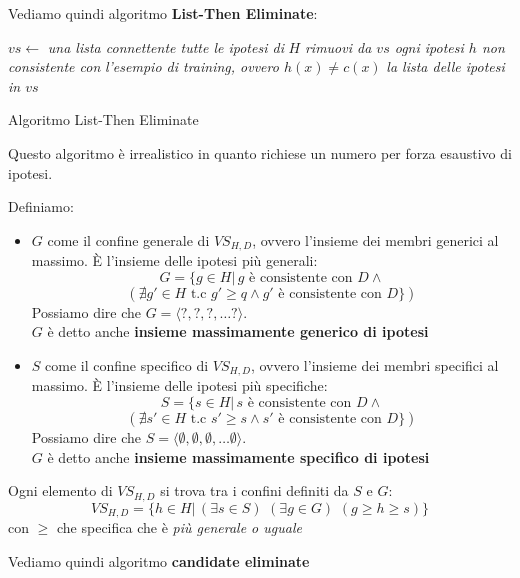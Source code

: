 \documentclass[a4paper,12pt, oneside]{book}
\begin{document}
Vediamo quindi algoritmo \textbf{List-Then Eliminate}:
\begin{algorithm}[H]
  \begin{algorithmic}
    \State $vs \gets$ \textit{una lista connettente tutte le ipotesi di } $H$
    \State \textit{rimuovi da $vs$ ogni ipotesi $h$ non consistente con}
    \State \textit{l'esempio di training, ovvero $h(x)\neq c(x)$}
    \EndFor
    \Return \textit{la lista delle ipotesi in $vs$}
    \EndFunction
  \end{algorithmic}
  \caption{Algoritmo List-Then Eliminate}
\end{algorithm}
Questo algoritmo è irrealistico in quanto richiese un numero per forza esaustivo
di ipotesi.
\begin{definizione}
  Definiamo:
  \begin{itemize}
    \item $G$ come il confine generale di $VS_{H,D}$, ovvero l'insieme dei
    membri generici al massimo. È l'insieme delle ipotesi più generali:
    \[G=\{g\in H|\, g\mbox{ è consistente con }D \land\]
    \[ (\nexists g'\in H \mbox{ t.c } g'\geq q \land g'\mbox{ è consistente con
      }D\})\]
    Possiamo dire che $G=\langle ?,?,?,\ldots ?\rangle$.\\
    $G$ è detto anche \textbf{insieme massimamente generico di ipotesi}
    \item $S$ come il confine specifico di $VS_{H,D}$, ovvero l'insieme dei
    membri specifici al massimo. È l'insieme delle ipotesi più specifiche:
     \[S=\{s\in H|\, s\mbox{ è consistente con }D \land\]
    \[ (\nexists s'\in H \mbox{ t.c } s'\geq s \land s'\mbox{ è consistente con
      }D\})\]
    Possiamo dire che $S=\langle \emptyset,\emptyset,\emptyset,\ldots \emptyset
    \rangle$.\\
        $G$ è detto anche \textbf{insieme massimamente specifico di ipotesi}

      \end{itemize}
    \end{definizione}
    \begin{teorema}
      Ogni elemento di $VS_{H,D}$ si trova tra i confini definiti da $S$ e $G$:
      \[VS_{H,D}=\{h\in H|\,(\exists s\in S)\,\,(\exists g\in G)\,\,(g\geq h\geq
        s)\}\]
      con $\geq$ che specifica che è \textit{più generale o uguale}
    \end{teorema}
    Vediamo quindi algoritmo \textbf{candidate eliminate}
\end{document}
